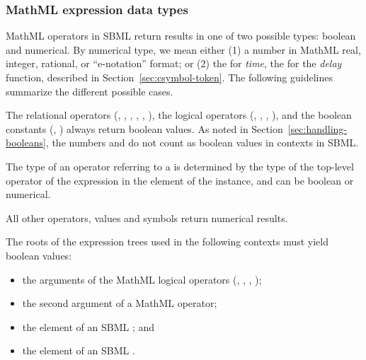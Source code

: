 \begin{blockChanged}
\end{blockChanged}

\subsubsection{MathML expression data types}
\label{sec:mathmltype}

MathML operators in SBML return results in one of two
possible types: boolean and numerical.  By numerical type,
we mean either (1) a number in MathML real, integer, rational, or
``e-notation'' format; or (2) the  for \emph{time},
the  for the \emph{delay} function,  described in
Section~\ref{sec:csymbol-token}.  The following guidelines
summarize the different possible cases.

The relational operators (, , ,
, , ), the logical operators
(, , , ), and the
boolean constants (, ) always return
boolean values.  As noted in
  Section~\ref{sec:handling-booleans}, the numbers  and
   do not count as boolean values in \mathml
  contexts in SBML.

The type of an operator referring to a \FunctionDefinition is
determined by the type of the top-level operator of the expression
in the  element of the \FunctionDefinition
instance, and can be boolean or numerical.

All other operators, values and symbols return numerical
results.

The roots of the expression trees used in the following contexts
must yield boolean values:

\begin{itemize}\setlength{\parskip}{-0.2ex}

\item the arguments of the MathML logical operators (,
, , );

\item the second argument of a MathML  operator;

\item the  element of an SBML \Event; and

\item the  element of an SBML \Constraint.

\end{itemize}

